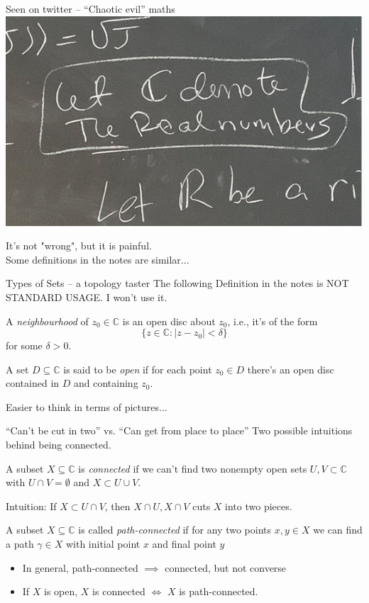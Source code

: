 \documentclass{beamer}
\newcommand{\C}{\mathbb{C}}
\begin{document}
\begin{frame}{Seen on twitter -- ``Chaotic evil'' maths}
  \includegraphics[width=\textwidth,height=0.8\textheight,keepaspectratio]{ChaoticEvil.png}
  
It's not "wrong", but it is painful. \\ Some definitions in the notes are similar...
\end{frame}


\begin{frame}{Types of Sets -- a topology taster}
The following Definition in the notes is NOT STANDARD USAGE.  
I won't use it.
    \begin{definition}[4.1 in notes]
    A \emph{neighbourhood} of $z_0\in\C$ is an open disc about $z_0$, i.e., it's of the form
    $$\{z\in\C : |z-z_0|<\delta\}$$
    for some $\delta>0$.
\end{definition}    
\begin{definition}
A set $D\subseteq \C$ is said to be \emph{open} if for each point $z_0\in D$ there's an open disc contained in $D$ and containing $z_0$.
\end{definition}
Easier to think in terms of pictures...
\end{frame}
\begin{frame}{``Can't be cut in two'' vs. ``Can get from place to place''}
Two possible intuitions behind being connected. 
\begin{definition}[Connected]
A subset $X\subseteq\C$ is \emph{connected} if we can't find two nonempty open sets $U,V\subset\C$ with $U\cap V=\emptyset$ and $X\subset U\cup V$.
\end{definition}
 Intuition: If $X\subset U\cap V$, then $X\cap U, X\cap V$ cuts $X$ into two pieces.
\begin{definition}    
A subset $X\subseteq \C$ is called \emph{path-connected} if for any two points $x,y\in X$ we can find a path $\gamma\in X$ with initial point $x$ and final point $y$
\end{definition}
\begin{itemize}
    \item In general, path-connected $\implies$ connected, but not converse
\item If $X$ is open, $X$ is connected $\iff$ $X$ is path-connected.
\end{itemize}
\end{frame}
\end{document}
